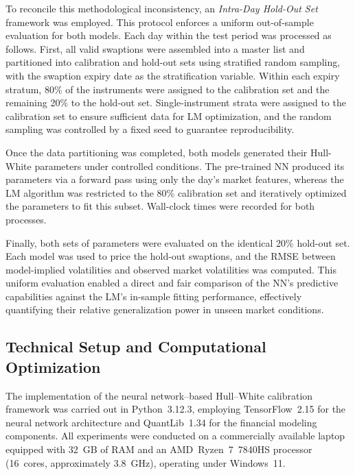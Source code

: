 {To reconcile this methodological inconsistency, an \emph{Intra-Day Hold-Out Set} framework was employed. This protocol enforces a uniform out-of-sample evaluation for both models. Each day within the test period was processed as follows. First, all valid swaptions were assembled into a master list and partitioned into calibration and hold-out sets using stratified random sampling, with the swaption expiry date as the stratification variable. Within each expiry stratum, 80\% of the instruments were assigned to the calibration set and the remaining 20\% to the hold-out set. Single-instrument strata were assigned to the calibration set to ensure sufficient data for LM optimization, and the random sampling was controlled by a fixed seed to guarantee reproducibility.  

Once the data partitioning was completed, both models generated their Hull-White parameters under controlled conditions. The pre-trained NN produced its parameters via a forward pass using only the day’s market features, whereas the LM algorithm was restricted to the 80\% calibration set and iteratively optimized the parameters to fit this subset. Wall-clock times were recorded for both processes.  

Finally, both sets of parameters were evaluated on the identical 20\% hold-out set. Each model was used to price the hold-out swaptions, and the RMSE between model-implied volatilities and observed market volatilities was computed. This uniform evaluation enabled a direct and fair comparison of the NN’s predictive capabilities against the LM’s in-sample fitting performance, effectively quantifying their relative generalization power in unseen market conditions.

\subsection{Technical Setup and Computational Optimization}
\label{subsec:technical_setup}
The implementation of the neural network–based Hull–White calibration framework was carried out in Python~3.12.3, employing TensorFlow~2.15 for the neural network architecture and QuantLib~1.34 for the financial modeling components. All experiments were conducted on a commercially available laptop equipped with 32~GB of RAM and an AMD~Ryzen~7~7840HS processor (16~cores, approximately 3.8~GHz), operating under Windows~11.

}
